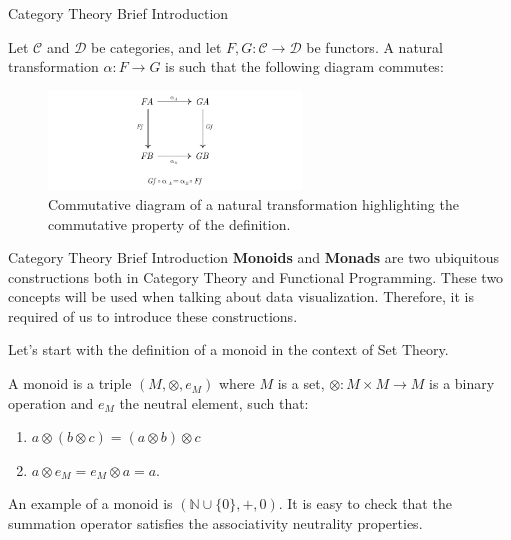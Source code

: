 \documentclass[aspectratio=169,xcolor=dvipsnames,10pt]{beamer}
\theoremstyle{definition}
\begin{document}
\begin{frame}[fragile]{Category Theory Brief Introduction}
	\begin{definition}
		Let $\mathcal C$ and $\mathcal D$ be categories, and let $F,G:\mathcal C \to \mathcal D$ be functors.
		A natural transformation $\alpha: F \to G$ is such that the following diagram commutes:
		\begin{figure}[H]
			\begin{center}
				\includegraphics[width=0.60\textwidth]{./figs/NaturalTransformation.pdf}
			\end{center}
			\caption{Commutative diagram of a natural transformation highlighting the commutative property of the definition.}
			\label{fig:NaturalTransformation}
		\end{figure}
	\end{definition}
\end{frame}

\begin{frame}[fragile]{Category Theory Brief Introduction}
	\textbf{Monoids} and \textbf{Monads} are two ubiquitous constructions both in Category Theory and
	Functional Programming. These two concepts will be used when talking about
	data visualization. Therefore, it is required of us to introduce these constructions.

	Let's start with the definition of a monoid in the context of Set Theory.

	\begin{definition}
		A monoid is a triple $(M, \otimes, e_M)$ where $M$ is a set, $\otimes:M\times M \to M$ is a binary operation
		and $e_M$ the neutral element, such that:
		\begin{enumerate}
			\item $a \otimes (b \otimes c) = (a \otimes b) \otimes c$
			\item $a \otimes e_M = e_M \otimes a = a$.
		\end{enumerate}
		\label{def:monoid}
	\end{definition}

	An example of a monoid is $(\mathbb N \cup \{0\}, +, 0)$.
	It is easy to check that the summation operator satisfies the
	associativity neutrality properties.
\end{frame}
\end{document}
